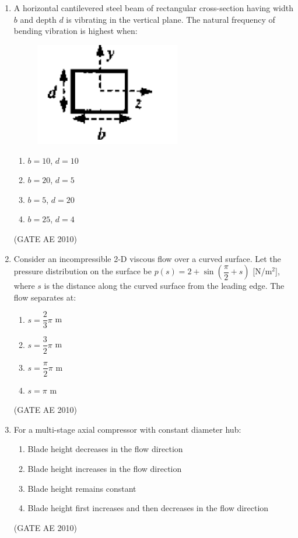 \documentclass[journal]{IEEEtran}
\begin{document}
\begin{enumerate}
\item A horizontal cantilevered steel beam of rectangular cross-section having width $b$ and depth $d$ is vibrating in the vertical plane. The natural frequency of bending vibration is highest when:

\begin{figure}[H]
    \centering
    \includegraphics[width=0.6\textwidth]{3.png}
    \caption{}
    \label{fig:question17}
\end{figure}
    
\begin{multicols}{4}
\begin{enumerate}
\item $b = 10$, $d = 10$  
\item $b = 20$, $d = 5$  
\item $b = 5$, $d = 20$  
\item $b = 25$, $d = 4$  
\end{enumerate}
\end{multicols}
\hfill (GATE AE 2010)

\item Consider an incompressible 2-D viscous flow over a curved surface. Let the pressure distribution on the surface be $p(s) = 2 + \sin\left(\dfrac{\pi}{2} + s\right)$ [N/m$^2$], where $s$ is the distance along the curved surface from the leading edge. The flow separates at:

\begin{multicols}{4}
\begin{enumerate}
\item $s = \dfrac{2}{3}\pi$ m  
\item $s = \dfrac{3}{2}\pi$ m  
\item $s = \dfrac{\pi}{2}\pi$ m  
\item $s = \pi$ m  
\end{enumerate}
\end{multicols}
\hfill (GATE AE 2010)

\item For a multi-stage axial compressor with constant diameter hub:
\begin{enumerate}
\item Blade height decreases in the flow direction  
\item Blade height increases in the flow direction  
\item Blade height remains constant  
\item Blade height first increases and then decreases in the flow direction  
\end{enumerate}
\hfill (GATE AE 2010)


\end{enumerate}
\end{document}
